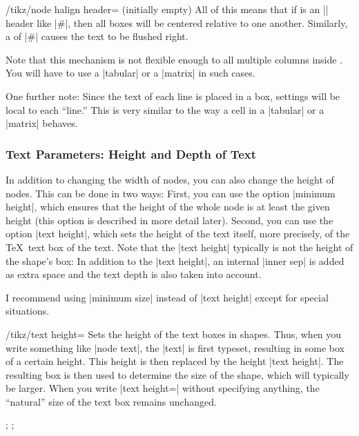 \begin{key}{/tikz/node halign header= (initially
    \normalfont empty)}
  All of this means that if  is an |\halign| header
  like |\hfil#\hfil\cr|, then all boxes will be centered relative to
  one another. Similarly, a  of |\hfil#\cr| causes the
  text to be flushed right.

  Note that this mechanism is not flexible enough to all multiple
  columns inside . You will have to use a |tabular| or a
  |matrix| in such cases.

  One further note: Since the text of each line is placed in a box,
  settings will be local to each ``line.'' This is very similar to the
  way a cell in a |tabular| or a |matrix| behaves.
\end{key}


\subsubsection{Text Parameters: Height and Depth of Text}

In addition to changing the width of nodes, you can also change the
height of nodes. This can be done in two ways: First, you can use the
option |minimum height|, which ensures that the height of the whole
node is at least the given height (this option is described in more
detail later). Second, you can use the option |text height|, which
sets the height of the text itself, more precisely, of the \TeX\ text
box of the text. Note that the |text height| typically is not the
height of the shape's box: In addition to the |text height|, an
internal |inner sep| is added as extra space and the text depth is
also taken into account.

I recommend using |minimum size| instead of |text height| except for
special situations.

\begin{key}{/tikz/text height=}
  Sets the height of the text boxes in shapes. Thus, when you write
  something like |node {text}|, the |text| is first typeset, resulting
  in some box of a certain height. This height is then replaced by the
  height |text height|. The resulting box is then used to determine
  the size of the shape, which will typically be larger. When you
  write |text height=| without specifying anything, the ``natural''
  size of the text box remains unchanged.
\begin{codeexample}[]
\tikz {};
\tikz {};
\end{codeexample}
\end{key}

